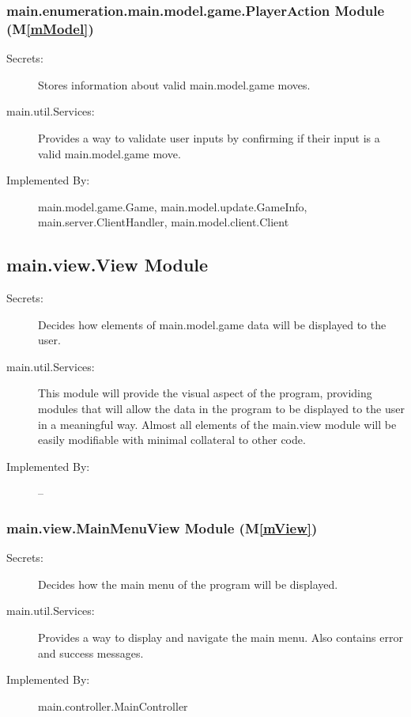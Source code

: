 \documentclass[12pt, titlepage]{article}
\newcommand{\mref}[1]{M\ref{#1}}
\begin{document}
\subsubsection{ main.enumeration.main.model.game.PlayerAction Module (\mref{mModel})}
    \begin{description}
    \item[Secrets:] Stores information about valid main.model.game moves.
    \item[main.util.Services:] Provides a way to validate user inputs by confirming if their input is a valid main.model.game move.
    \item[Implemented By:] main.model.game.Game, main.model.update.GameInfo, main.server.ClientHandler, main.model.client.Client
    \end{description}

\subsection{main.view.View Module}
    \begin{description}
    \item[Secrets:] Decides how elements of main.model.game data will be displayed to the user.
    \item[main.util.Services:] This module will provide the visual aspect of the program, providing modules that will allow the data in the program to be displayed to the user in a meaningful way. Almost all elements of the main.view module will be easily modifiable with minimal collateral to other code.
    \item[Implemented By:] --
    \end{description}

\subsubsection{ main.view.MainMenuView Module (\mref{mView})}
    \begin{description}
    \item[Secrets:] Decides how the main menu of the program will be displayed.
    \item[main.util.Services:] Provides a way to display and navigate the main menu. Also contains error and success messages.
    \item[Implemented By:] main.controller.MainController
    \end{description}
    
\end{document}
